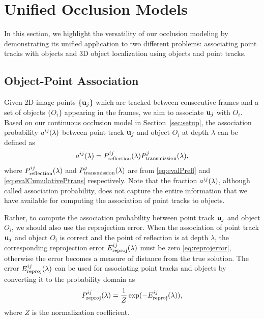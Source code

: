\section{Unified Occlusion Models}
\label{sec:unified}

In this section, we highlight the versatility of our occlusion modeling by demonstrating its unified application to two different problems: associating point tracks with objects and 3D object localization using objects and point tracks.

\subsection{Object-Point Association}
\label{sec:association}


Given 2D image points $\{\mathbf{u}_j\}$ which are tracked between consecutive frames and a set of objects $\{O_i\}$ appearing in the frames, we aim to associate $\mathbf{u}_j$ with $O_i$. Based on our continuous occlusion model in Section~\ref{sec:setup}, the association probability $a^{ij}(\lambda)$ between point track $\mathbf{u}_j$ and object $O_i$ at depth $\lambda$ can be defined as
\begin{align}
a^{ij}(\lambda) = P^{ij}_{\text{reflection}}(\lambda)P^{j}_{\text{transmission}}(\lambda),
\label{eq:defineassocP}
\end{align}
where $P^{ij}_{\text{reflection}}(\lambda)$ and $P^{j}_{\text{transmission}}(\lambda)$ are from \eqref{eq:evalPrefl} and \eqref{eq:evalCumulativePtrans} respectively. Note that the fraction $a^{ij}(\lambda)$, although called association probability, does not capture the entire information that we have available for computing the association of point tracks to objects. 

Rather, to compute the association probability between point track $\mathbf{u}_j$ and object $O_i$, we should also use the reprojection error. When the association of point track $\mathbf{u}_j$ and object $O_i$ is correct and the point of reflection is at depth $\lambda$, the corresponding reprojection error $E^{ij}_{\text{reproj}}(\lambda)$ must be zero \eqref{eq:reprojerror}, otherwise the error becomes a measure of distance from the true solution. The error $E^{ij}_{\text{reproj}}(\lambda)$ can be used for associating point tracks and objects by converting it to the probability domain as
\begin{align}
  P^{ij}_{\text{reproj}}(\lambda) = \frac{1}{Z}\exp(-E^{ij}_{\text{reproj}}(\lambda)),
\label{eq:Passocbyreproj}
\end{align}
where $Z$ is the normalization coefficient.

